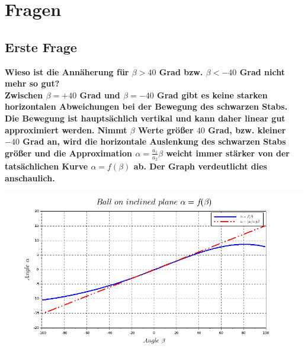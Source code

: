 \section{Fragen}
\subsection{Erste Frage}
\bfseries Wieso ist die Annäherung für $\beta > 40$ Grad bzw. $\beta < -40$ Grad nicht mehr so gut? \\
\mdseries Zwischen $\beta=+40$ Grad und $\beta=-40$ Grad gibt es keine starken horizontalen Abweichungen bei der Bewegung des schwarzen Stabs. Die Bewegung ist hauptsächlich vertikal und kann daher linear gut approximiert werden. Nimmt $\beta$ Werte größer $40$ Grad, bzw. kleiner $-40$ Grad an, wird die horizontale Auslenkung des schwarzen Stabs größer und die Approximation $\alpha=\frac{a_1}{a_2}\beta$ weicht immer stärker von der tatsächlichen Kurve $\alpha = f(\beta)$ ab. Der Graph verdeutlicht dies anschaulich.
\begin{center}
	\begin{minipage}{\linewidth}
		\centering
		\includegraphics[scale=0.45]{images/plot1_1.png}
	\end{minipage}
\end{center}



